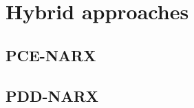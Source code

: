 
\section{Hybrid approaches}

\subsection{PCE-NARX}
\parencite{maiSurrogateModellingStochastic2016}
\subsection{PDD-NARX}
\parencite{ebadollahiTimedependentUncertaintyQuantification2025}